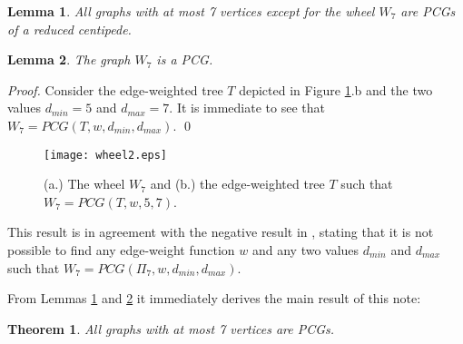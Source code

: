 \documentclass[review]{elsarticle}
\newtheorem{theorem}{Theorem}
\newtheorem{lemma}{Lemma}
\begin{document}
\begin{lemma}
\label{lemma:567}
All graphs with at most 7 vertices except for the wheel $W_7$ are PCGs of a reduced centipede.
\end{lemma}


\begin{lemma}
\label{lemma:wheel}
The graph $W_7$ is a PCG.
\end{lemma}
\begin{proof}
Consider the edge-weighted tree $T$ depicted in Figure \ref{fig.wheel}.b and the two values $d_{min}=5$ and $d_{max}=7$.
It is immediate to see that $W_7=PCG(T, w, d_{min}, d_{max})$. \qed
\end{proof}

\begin{figure}[!ht]
\centering
\texttt{[image: wheel2.eps]}
\caption{(a.) The wheel $W_7$ and (b.) the edge-weighted tree $T$ such that $W_7=PCG(T, w, 5, 7)$.} 
\label{fig.wheel}
\end{figure}

This result is in agreement with the negative result in \cite{CFS}, stating that it is not possible to find any edge-weight function $w$ and any two values $d_{min}$ and $d_{max}$ such that $W_7=PCG(\Pi_7, w, d_{min}, d_{max})$.

\medskip

From Lemmas \ref{lemma:567} and \ref{lemma:wheel} it immediately derives the main result of this note:

\begin{theorem}
All graphs with at most 7 vertices are PCGs.
\end{theorem}
\end{document}
